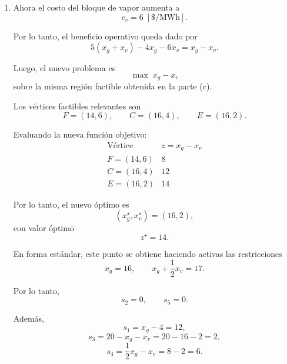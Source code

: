 \begin{enumerate}[label=\alph*)]
La solución básica factible óptima es
\[
x^\star=
\begin{pmatrix}
x_g\\
x_v\\
s_1\\
s_2\\
s_3\\
s_4\\
s_5
\end{pmatrix}
=
\begin{pmatrix}
14\\
6\\
10\\
2\\
0\\
1\\
0
\end{pmatrix}.
\]

Como en el óptimo se cumplen con igualdad las restricciones
\[
x_g+x_v=20,
\qquad
x_g+\frac{1}{2}x_v=17,
\]
se tiene que
\[
s_3=0,
\qquad
s_5=0.
\]

Luego, las variables no básicas son
\[
\mathcal{N}=\{s_3,s_5\},
\]
y la base óptima es
\[
\mathcal{B}=\{x_g,x_v,s_1,s_2,s_4\}.
\]

\item
Ahora el costo del bloque de vapor aumenta a
\[
c_v=6 \; [\$/\mathrm{MWh}].
\]

Por lo tanto, el beneficio operativo queda dado por
\[
5(x_g+x_v)-4x_g-6x_v=x_g-x_v.
\]

Luego, el nuevo problema es
\[
\max \; x_g-x_v
\]
sobre la misma región factible obtenida en la parte (c).

Los vértices factibles relevantes son
\[
F=(14,6), \qquad C=(16,4), \qquad E=(16,2).
\]

Evaluando la nueva función objetivo:
\[
\begin{array}{c|c}
\text{Vértice} & z=x_g-x_v \\ \hline
F=(14,6) & 8 \\
C=(16,4) & 12 \\
E=(16,2) & 14
\end{array}
\]

Por lo tanto, el nuevo óptimo es
\[
(x_g^\star,x_v^\star)=(16,2),
\]
con valor óptimo
\[
z^\star=14.
\]

En forma estándar, este punto se obtiene haciendo activas las restricciones
\[
x_g=16,
\qquad
x_g+\frac{1}{2}x_v=17.
\]

Por lo tanto,
\[
s_2=0,
\qquad
s_5=0.
\]

Además,
\[
s_1=x_g-4=12,
\]
\[
s_3=20-x_g-x_v=20-16-2=2,
\]
\[
s_4=\frac{1}{2}x_g-x_v=8-2=6.
\]


\end{enumerate}

